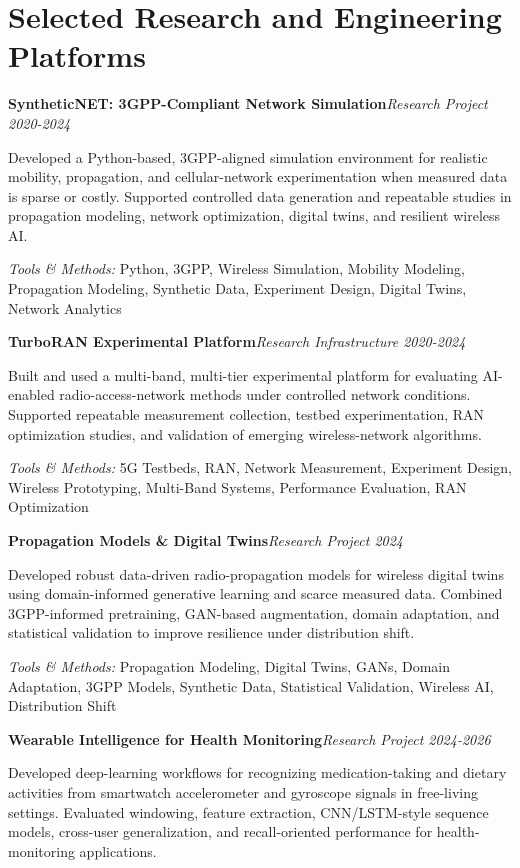 \documentclass[9pt,letterpaper]{extarticle}
\newcommand{\entry}[2]{\Needspace{4\baselineskip}\textbf{#1}\hfill\textit{#2}\par}
\begin{document}
\section{Selected Research and Engineering Platforms}
\entry{SyntheticNET: 3GPP-Compliant Network Simulation}{Research Project \textbar{} 2020-2024}
Developed a Python-based, 3GPP-aligned simulation environment for realistic mobility, propagation, and cellular-network experimentation when measured data is sparse or costly. Supported controlled data generation and repeatable studies in propagation modeling, network optimization, digital twins, and resilient wireless AI.\par
{\small\textit{Tools \& Methods:} Python, 3GPP, Wireless Simulation, Mobility Modeling, Propagation Modeling, Synthetic Data, Experiment Design, Digital Twins, Network Analytics\par}
\vspace{1pt}
\entry{TurboRAN Experimental Platform}{Research Infrastructure \textbar{} 2020-2024}
Built and used a multi-band, multi-tier experimental platform for evaluating AI-enabled radio-access-network methods under controlled network conditions. Supported repeatable measurement collection, testbed experimentation, RAN optimization studies, and validation of emerging wireless-network algorithms.\par
{\small\textit{Tools \& Methods:} 5G Testbeds, RAN, Network Measurement, Experiment Design, Wireless Prototyping, Multi-Band Systems, Performance Evaluation, RAN Optimization\par}
\vspace{1pt}
\entry{Propagation Models \& Digital Twins}{Research Project \textbar{} 2024}
Developed robust data-driven radio-propagation models for wireless digital twins using domain-informed generative learning and scarce measured data. Combined 3GPP-informed pretraining, GAN-based augmentation, domain adaptation, and statistical validation to improve resilience under distribution shift.\par
{\small\textit{Tools \& Methods:} Propagation Modeling, Digital Twins, GANs, Domain Adaptation, 3GPP Models, Synthetic Data, Statistical Validation, Wireless AI, Distribution Shift\par}
\vspace{1pt}
\entry{Wearable Intelligence for Health Monitoring}{Research Project \textbar{} 2024-2026}
Developed deep-learning workflows for recognizing medication-taking and dietary activities from smartwatch accelerometer and gyroscope signals in free-living settings. Evaluated windowing, feature extraction, CNN/LSTM-style sequence models, cross-user generalization, and recall-oriented performance for health-monitoring applications.\par
\end{document}
